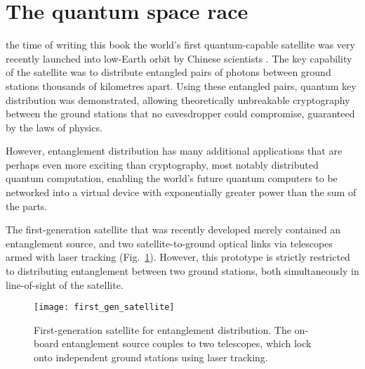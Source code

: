 %
%

\section{The quantum space race}\label{sec:quant_space_race_essay}

\newline

 the time of writing this book the world's first quantum-capable satellite was very recently launched into low-Earth orbit by Chinese scientists \cite{JWP}. The key capability of the satellite was to distribute entangled pairs of photons between ground stations thousands of kilometres apart. Using these entangled pairs, quantum key distribution was demonstrated, allowing theoretically unbreakable cryptography between the ground stations that no eavesdropper could compromise, guaranteed by the laws of physics.

However, entanglement distribution has many additional applications that are perhaps even more exciting than cryptography, most notably distributed quantum computation, enabling the world's future quantum computers to be networked into a virtual device with exponentially greater power than the sum of the parts.

The first-generation satellite that was recently developed merely contained an entanglement source, and two satellite-to-ground optical links via telescopes armed with laser tracking (Fig.~\ref{fig:first_gen_sat}). However, this prototype is strictly restricted to distributing entanglement between two ground stations, both simultaneously in line-of-sight of the satellite.

\begin{figure}[!htbp]
\texttt{[image: first\_gen\_satellite]}
\captionspacefig \caption{First-generation satellite for entanglement distribution. The on-board entanglement source couples to two telescopes, which lock onto independent ground stations using laser tracking.}\label{fig:first_gen_sat}	
\end{figure}

